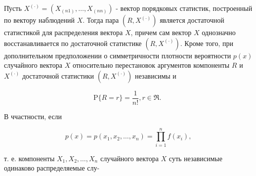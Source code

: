 \documentclass[10pt]{article}
\begin{document}
П̈усть $X^{(\cdot)}=\left(X_{(n 1)}, \ldots, X_{(n n)}\right)$ - вектор порядковых статистик, построенный по вектору наблюдений $X$. Тогда пара $\left(R, X^{(\cdot)}\right)$ является достаточной статистикой для распределения вектора $X$, причем сам вектор $X$ однозначно восстанавливается по достаточной статистике $\left(R, X^{(\cdot)}\right)$. Кроме того, при дополнительном предположении о симметричности плотности вероятности $p(x)$ случайного вектора $X$ относительно перестановок аргументов компоненты $R$ и $X^{(\cdot)}$ достаточной статистики $\left(R, X^{(\cdot)}\right)$ независимы и



\[

\mathrm{P}\{R=r\}=\frac{1}{n !}, r \in \Re \text {. }

\]



В ччастности, если



\[

p(x)=p\left(x_{1}, x_{2}, \ldots, x_{n}\right)=\prod_{i=1}^{n} f\left(x_{i}\right),

\]



т. е. компоненты $X_{1}, X_{2}, \ldots, X_{n}$ случайного вектора $X$ суть независимые одинаково распределяемые слу-
\end{document}
